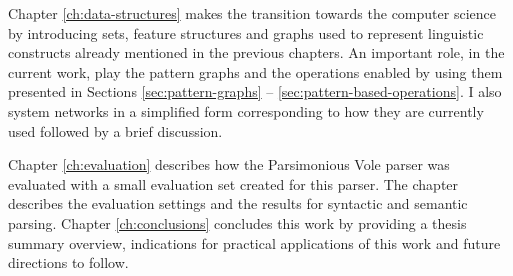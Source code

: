 Chapter \ref{ch:data-structures} makes the transition towards the computer science by introducing sets, feature structures and graphs used to represent linguistic constructs already mentioned in the previous chapters. An important role, in the current work, play the pattern graphs and the operations enabled by using them presented in Sections \ref{sec:pattern-graphs} -- \ref{sec:pattern-based-operations}. I also system networks in a simplified form corresponding to how they are currently used followed by a brief discussion. 


Chapter \ref{ch:evaluation} describes how the Parsimonious Vole parser was evaluated with a small evaluation set created for this parser. The chapter describes the evaluation settings and the results for syntactic and semantic parsing. Chapter \ref{ch:conclusions} concludes this work by providing a thesis summary overview, indications for practical applications of this work and future directions to follow. 


%
%
%
